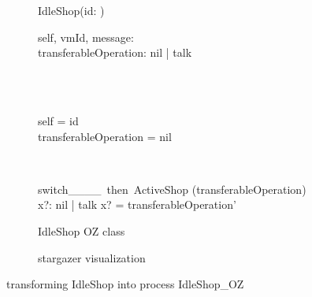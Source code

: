 \begin{figure}[H]
\begin{subfigure}{.6\textwidth}
\centering
\begin{class}{IdleShop(id: \integer)}
\\
\begin{state}
self, vmId, message: \integer
\\transferableOperation: nil | talk
\end{state} 
\\
\begin{init}
\\self = id
\\transferableOperation = nil
\end{init} 
\\
\begin{op}{switch\_\_\_\_\ then\ ActiveShop}
\Delta (transferableOperation)
\\x?: nil | talk
\ST
x? = transferableOperation'
\end{op}
\end{class}
  \caption{IdleShop OZ class}
\end{subfigure}%
\begin{subfigure}{.4\textwidth}
  \centering
{}
  \caption{stargazer visualization}
\end{subfigure}
\caption{transforming IdleShop into \picalc{} process IdleShop\_OZ}
\label{tra_idleShop_OZ}
\end{figure}

